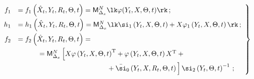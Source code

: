     \begin{equation}

    \left.

    \begin{array}{rl}

    f_1& = f_1\left(\hat X_t, Y_t,R_t, \Theta, t \right)= 

    {\sf M}_{\Delta_x}^N \lk\varphi(Y_t,X,\Theta, t)\rk\,;

\\[6pt]

    h_1&=h_1 \left(\hat X_t, Y_t,R_t,\Theta,  t \right)= {\sf M}_{\Delta_x}^N \lk \si_1

    \left(Y_t,X,\Theta, t\right)+X\varphi_1\left(Y_t,X,\Theta, t\right)\rk\,;

\\[6pt]

 f_2&=f_2 \left(\hat X_t, Y_t,R_t,\Theta, t \right)={}\\[6pt]

    &\hspace*{10mm}{}=

    {\sf M}_{\Delta_x}^N \left[ X\varphi\left(Y_t,X,\Theta, t\right)^{\mathrm{T}} +

    \varphi\left(Y_t,X,\Theta, t\right)X^{\mathrm{T}} +{}\right.\\[6pt]

    &   \left. \hspace*{45mm}{}+

    \bar\si_0 \left(Y_t,X,R_t,\Theta, t\right)

    \vphantom{\left(Y_t,X,\Theta, t\right)^{\mathrm{T}}}

    \right]\si_2\left(

    Y_t,\Theta, t\right)^{-1}\,;

\end{array}

\right\}

\label{e3.12a-s1}

\end{equation}



\noindent

